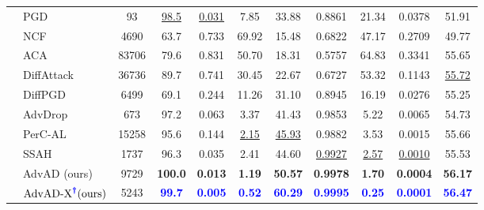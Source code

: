 \documentclass{article}
\begin{document}
\begin{table}[t]
{\begin{tabular}{clccccccccc}
        \midrule
                                    & PGD \cite{madry2018towards}           & 93        & \underline{98.5}      & \underline{0.031}     & 7.85      & 33.88     & 0.8861    & 21.34     & 0.0378    & 51.91 \\
                                    & NCF \cite{yuan2022natural}           & 4690      & 63.7      & 0.733     & 69.92     & 15.48     & 0.6822    & 47.17     & 0.2709    & 49.77 \\
                                    & ACA \cite{chen2024content}           & 83706     & 79.6      & 0.831     & 50.70     & 18.31     & 0.5757    & 64.83     & 0.3341    & 55.65 \\
                                    & DiffAttack \cite{chen2023diffusion}    & 36736     & 89.7      & 0.741     & 30.45     & 22.67     & 0.6727    & 53.32     & 0.1143    & \underline{55.72} \\
                                    & DiffPGD \cite{xue2023diffusion}       & 6499      & 69.1      & 0.244     & 11.26     & 31.10     & 0.8945    & 16.19     & 0.0276    & 55.25 \\
                                    & AdvDrop \cite{duan2021advdrop}       & 673       & 97.2      & 0.063     & 3.37      & 41.43     & 0.9853    & 5.22      & 0.0065    & 54.73 \\
                                    & PerC-AL \cite{zhao2020towards}       & 15258     & 95.6      & 0.144     & \underline{2.15}      & \underline{45.93}     & 0.9882    & 3.53      & 0.0015    & 55.66 \\
                                    & SSAH \cite{luo2022frequency}          & 1737      & 96.3      & 0.035     & 2.41      & 44.60     & \underline{0.9927}    & \underline{2.57}      & \underline{0.0010}    & 55.53 \\
        \cmidrule(lr){2-11}
                                    & AdvAD (ours)        & 9729      & \textbf{100.0}     & \textbf{0.013}     & \textbf{1.19}      & \textbf{50.57}     & \textbf{0.9978}    & \textbf{1.70}      & \textbf{0.0004}    & \textbf{56.17} \\
                                    & $\text{AdvAD-X}^{\textcolor{blue}{\boldsymbol{\dag}}} \text{(ours)}$ & 5243    & \textcolor{blue}{\textbf{99.7}}      & \textcolor{blue}{\textbf{0.005}}     & \textcolor{blue}{\textbf{0.52}}      & \textcolor{blue}{\textbf{60.29}}     & \textcolor{blue}{\textbf{0.9995}}    & \textcolor{blue}{\textbf{0.25}}      & \textcolor{blue}{\textbf{0.0001}}    & \textcolor{blue}{\textbf{56.47}} \\


\end{tabular}}
\end{table}
\end{document}
